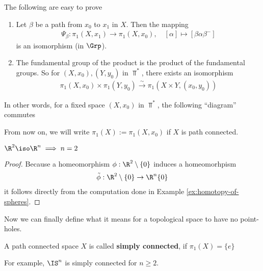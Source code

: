 
\begin{lem}[]
  The following are easy to prove
\begin{enumerate}
  \item Let $\beta$ be a path from $x_0$ to $x_1$ in $X$. Then the mapping
    \begin{align*}
      \Psi_{\beta}: \pi_1(X,x_1) \to  \pi_1(X,x_0),  \quad [\alpha] \mapsto [\beta \alpha \beta^{-}]
    \end{align*}
    is an isomorphism (in $\Grp$).
  \item The fundamental group of the product is the product of the fundamental groups. So for $(X,x_0),(Y,y_0)$ in $\Top^{\ast}$, there exists an isomorphism
    \begin{align*}
      \pi_1(X,x_0) \times \pi_1(Y,y_0) \stackrel{\sim}{\to} \pi_1(X \times Y, (x_0,y_0))
    \end{align*}
\end{enumerate}
In other words, for a fixed space $(X,x_0)$ in $\Top^{\ast}$, the following ``diagram'' commutes
\begin{center}
\end{center}
\end{lem}

From now on, we will write $\pi_1(X) := \pi_1(X,x_0)$ if $X$ is path connected.

\begin{cor}[]
$\R^{2} \iso \R^{n} \implies n = 2$
\end{cor}
\begin{proof}
  Because a homeomorphism $\phi: \R^{2} \setminus \{0\}$ induces a homeomorhpism
  \begin{align*}
    \tilde{\phi}: \R^{2} \setminus \{0\} \to  \R^{n} \{0\}
  \end{align*}
  it follows directly from the computation done in Example \ref{ex:homotopy-of-spheres}.
\end{proof}


Now we can finally define what it means for a topological space to have no point-holes.
\begin{dfn}[]
  A path connected space $X$ is called \textbf{simply connected}, if $\pi_1(X) = \{e\}$
\end{dfn}
For example, $\IS^{n}$ is simply connected for $n \geq 2$.

